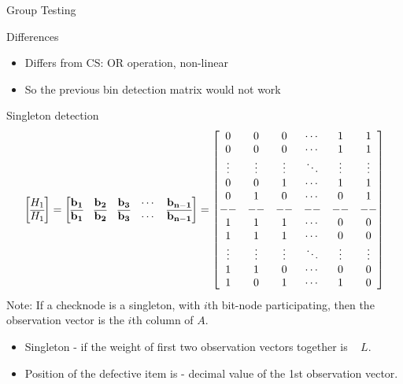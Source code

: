 \begin{frame}{Group Testing}
\begin{block}{Differences}
\begin{itemize}
\item Differs from CS: OR operation, non-linear
\item So the previous bin detection matrix would not work
\end{itemize}
\end{block}	

\begin{block}{Singleton detection}			
{
 \tiny
$$
			\begin{bmatrix}
		H_1 \\
		\overline{H_1}
\end{bmatrix}
=
\begin{bmatrix}
					\bf{b_1} & \bf{b_2} & \bf{b_3} & \cdots & \bf{b_{n-1}}\\
				   	\bf{\overline{b_1}} & \bf{\overline{b_2}} & \bf{\overline{b_3}} & \cdots & \bf{\overline{b_{n-1}}} \end{bmatrix}
=
 \begin{bmatrix}
		0      & 0   & 0 & \cdots & 1 &  1 \\
		0      & 0   & 0 & \cdots & 1 &  1  \\
		\vdots & \vdots & \vdots & \ddots & \vdots & \vdots \\
		0      & 0   & 1 & \cdots & 1 &  1  \\
		0      & 1   & 0 & \cdots & 0 &  1  \\
		-- & -- & -- & -- & -- & --  \\
        1      & 1   & 1 & \cdots & 0 &  0 \\
		1      & 1   & 1 & \cdots & 0 &  0  \\
		\vdots & \vdots & \vdots & \ddots & \vdots & \vdots \\
		1      & 1   & 0 & \cdots & 0 &  0  \\
		1      & 0   & 1 & \cdots & 1 &  0  \\
\end{bmatrix}
$$
}
\alert{Note:} If a checknode is a singleton, with $i$th bit-node participating, then the observation vector is the $i$th column of $A$.

\begin{itemize}
\item Singleton - if the {\color{blue}weight of first two observation} vectors together is{ \ \color{blue} $L$}.
\item {\color{blue}Position} of the defective item is - {\color{blue} decimal value of the 1st observation vector}.
\end{itemize}    				
\end{block}					
\end{frame}

